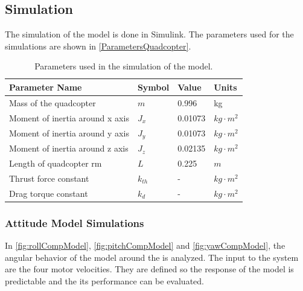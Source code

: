 \subsection{Simulation}
The simulation of the model is done in Simulink. The parameters used for the simulations are shown in \autoref{ParametersQuadcopter}.
\begin{table}[H]
	\centering
	\begin{tabular}{|l|l|l|p{3cm}|}
		\hline %
		\textbf{Parameter Name}&\textbf{Symbol} &\textbf{Value} &\textbf{Units}\\
		\hline %
		Mass of the quadcopter  & $m$ & 0.996       &kg\\
		\hline
		Moment of inertia around x axis       & $J_x$  & 0.01073       & $kg \cdot m^2$\\
		\hline %
		Moment of inertia around y axis       & $J_y$  & 0.01073       & $kg \cdot m^2$\\
		\hline %
		Moment of inertia around z axis       & $J_z$  & 0.02135       & $kg \cdot m^2$\\
		\hline %
		Length of quadcopter rm       & $L$  &   0.225       & $m$\\
		\hline %
		Thrust force constant       & $k_{th}$  & -       & $kg \cdot m^2$\\
		\hline %
		Drag torque constant      & $k_{d}$  & -       & $kg \cdot m^2$\\
		\hline %
	\end{tabular}
	\caption{Parameters used in the simulation of the model.}
	\label{ParametersQuadcopter}
\end{table}\vspace{-18pt}

\subsubsection{Attitude Model Simulations}
In \autoref{fig:rollCompModel}, \ref{fig:pitchCompModel} and \ref{fig:yawCompModel}, the angular behavior of the model around the is analyzed. The input to the system are the four motor velocities. They are defined so the response of the model is predictable and the its performance can be evaluated.

